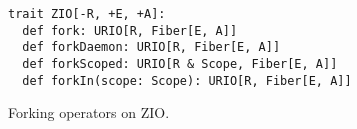 \begin{algorithm}

\begin{verbatim}
trait ZIO[-R, +E, +A]:
  def fork: URIO[R, Fiber[E, A]]
  def forkDaemon: URIO[R, Fiber[E, A]]
  def forkScoped: URIO[R & Scope, Fiber[E, A]]
  def forkIn(scope: Scope): URIO[R, Fiber[E, A]]
\end{verbatim}

\caption{Forking operators on ZIO. \label{zio:fork-operators}}
\end{algorithm}